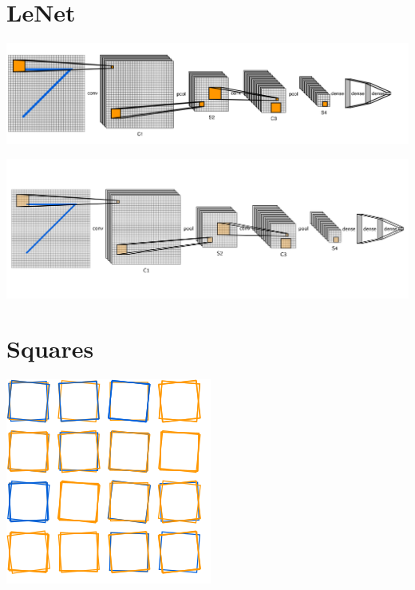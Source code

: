 \documentclass{article}%
\begin{document}
\pagebreak
\section{LeNet}

\includegraphics[width=\textwidth]{examples/output/lenet.png}

\includegraphics[width=\textwidth]{examples/output/lenet.pdf}

\pagebreak
\section{Squares}

\includegraphics[width=\textwidth]{examples/output/squares.png}
\end{document}
